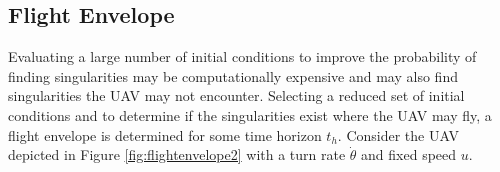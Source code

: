 \documentclass[conf]{new-aiaa}
\begin{document}
%
%
%
%
%
%
%
%


















\subsection{Flight Envelope}
Evaluating a large number of initial conditions to improve the probability of finding singularities may be computationally expensive and may also find singularities the UAV may not encounter. Selecting a reduced set of initial conditions and to determine if the singularities exist where the UAV may fly, a flight envelope is determined for some time horizon $t_h$. Consider the UAV depicted in Figure \ref{fig:flightenvelope2} with a turn rate $\dot{\theta}$ and fixed speed $u$. 
\end{document}
